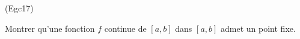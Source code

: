 \begin{tiny}(Egc17)\end{tiny} \label{Egc17} Montrer qu'une fonction $f$ continue de $[a,b]$ dans $[a,b]$ admet un point fixe.